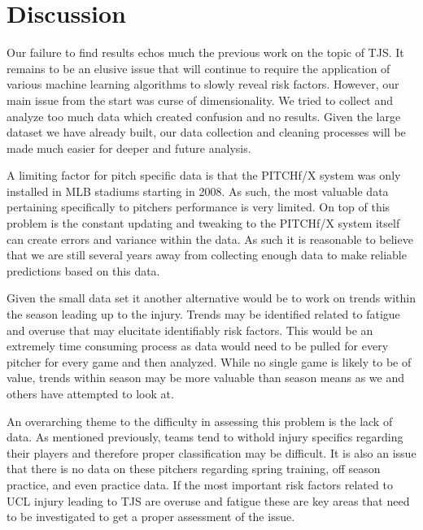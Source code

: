 \section{Discussion}

Our failure to find results echos much the previous work on the topic of TJS. It remains to be an elusive issue that will continue to require the application of various machine learning algorithms to slowly reveal risk factors. However, our main issue from the start was curse of dimensionality. We tried to collect and analyze too much data which created confusion and no results. Given the large dataset we have already built, our data collection and cleaning processes will be made much easier for deeper and future analysis.

A limiting factor for pitch specific data is that the PITCHf/X system was only installed in MLB stadiums starting in 2008. As such, the most valuable data pertaining specifically to pitchers performance is very limited. On top of this problem is the constant updating and tweaking to the PITCHf/X system itself can create errors and variance within the data. As such it is reasonable to believe that we are still several years away from collecting enough data to make reliable predictions based on this data.

Given the small data set it another alternative would be to work on trends within the season leading up to the injury. Trends may be identified related to fatigue and overuse that may elucitate identifiably risk factors. This would be an extremely time consuming process as data would need to be pulled for every pitcher for every game and then analyzed. While no single game is likely to be of value, trends within season may be more valuable than season means as we and others have attempted to look at.

An overarching theme to the difficulty in assessing this problem is the lack of data. As mentioned previously, teams tend to withold injury specifics regarding their players and therefore proper classification may be difficult. It is also an issue that there is no data on these pitchers regarding spring training, off season practice, and even practice data. If the most important risk factors related to UCL injury leading to TJS are overuse and fatigue these are key areas that need to be investigated to get a proper assessment of the issue.